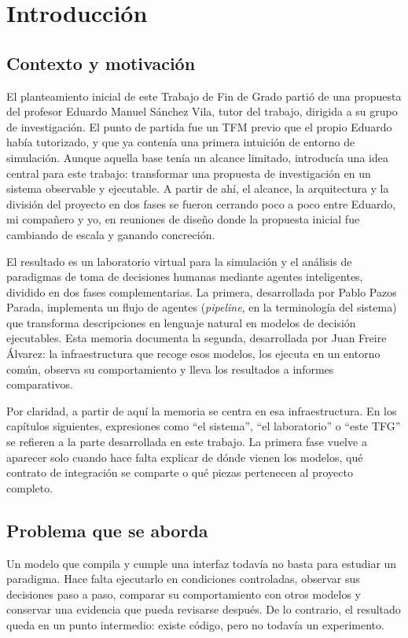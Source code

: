 \chapter{Introducción}

\section{Contexto y motivación}

El planteamiento inicial de este Trabajo de Fin de Grado partió de una
propuesta del profesor Eduardo Manuel Sánchez Vila, tutor del trabajo,
dirigida a su grupo de investigación. El punto de partida fue un TFM
previo que el propio Eduardo había tutorizado, y que ya contenía una
primera intuición de entorno de simulación. Aunque aquella base tenía un
alcance limitado, introducía una idea central para este trabajo: transformar
una propuesta de investigación en un sistema observable y ejecutable. A partir
de ahí, el alcance, la arquitectura y la división del proyecto en dos fases se fueron
cerrando poco a poco entre Eduardo, mi compañero y yo, en reuniones de
diseño donde la propuesta inicial fue cambiando de escala y ganando
concreción.

El resultado es un laboratorio virtual para la simulación y el
análisis de paradigmas de toma de decisiones humanas mediante agentes
inteligentes, dividido en dos fases complementarias. La primera,
desarrollada por Pablo Pazos Parada, implementa un flujo de agentes
(\textit{pipeline}, en la terminología del sistema) que
transforma descripciones en lenguaje natural en modelos de decisión
ejecutables. Esta memoria documenta la segunda, desarrollada por Juan Freire
Álvarez: la infraestructura que recoge esos modelos, los ejecuta en un entorno
común, observa su comportamiento y lleva los resultados a informes
comparativos.

Por claridad, a partir de aquí la memoria se centra en esa infraestructura. En
los capítulos siguientes, expresiones como ``el sistema'', ``el laboratorio'' o
``este TFG'' se refieren a la parte desarrollada en este trabajo. La primera
fase vuelve a aparecer solo cuando hace falta explicar de dónde vienen los
modelos, qué contrato de integración se comparte o qué piezas pertenecen al
proyecto completo.

\section{Problema que se aborda}

Un modelo que compila y cumple una interfaz todavía no basta para
estudiar un paradigma. Hace falta ejecutarlo en condiciones controladas,
observar sus decisiones paso a paso, comparar su comportamiento con otros
modelos y conservar una evidencia que pueda revisarse después. De lo
contrario, el resultado queda en un punto intermedio: existe código, pero
no todavía un experimento.

